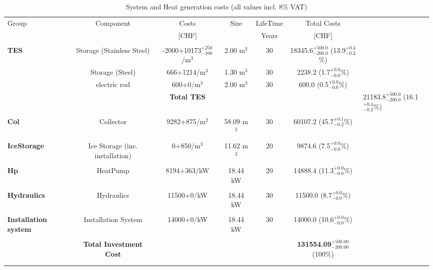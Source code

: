 \documentclass[english]{SPFShortReport}
\begin{document}
\begin{table}[!ht]
\centering
\caption{System and Heat generation costs (all values incl. 8$\%$ VAT) }
\begin{adjustbox}{max width =\textwidth}
\begin{tabular}{l | c c c c c } 
\hline
\hline
Group &Component &Costs &Size &LifeTime &Total Costs \\ 
 & &[CHF] & &Years &[CHF]\\ 
\hline
\\
\textbf{TES} & Storage (Stainless Steel) & -2000+10173$^{\mathrm{+250}}_{\mathrm{-100}}$/m$^3$ & 2.00 m$^3$ & 30 & 18345.6$^{\mathrm{+500.0}}_{\mathrm{-200.0}}$ (13.9$^{\mathrm{+0.4}}_{\mathrm{-0.2}}$\%) \\
 & Storage (Steel) & 666+1214/m$^3$ & 1.30 m$^3$ & 30 & 2238.2 (1.7$^{\mathrm{+0.0}}_{\mathrm{-0.0}}$\%) \\
 & electric rod & 600+0/m$^3$ & 2.00 m$^3$ & 30 & 600.0 (0.5$^{\mathrm{+0.0}}_{\mathrm{-0.0}}$\%) \\
&
 & \textbf{Total TES} & & & & 21183.8$^{\mathrm{+500.0}}_{\mathrm{-200.0}}$ (16.1$^{\mathrm{+0.4}}_{\mathrm{-0.2}}$\%) \\
\hline \\
\textbf{Col} & Collector & 9282+875/m$^2$ & 58.09 m$^2$ & 30 & 60107.2 (45.7$^{\mathrm{+0.1}}_{\mathrm{-0.2}}$\%) \\
\hline \\
\textbf{IceStorage} & Ice Storage (inc. installation) & 0+850/m$^3$ & 11.62 m$^3$ & 20 & 9874.6 (7.5$^{\mathrm{+0.0}}_{\mathrm{-0.0}}$\%) \\
\hline \\
\textbf{Hp} & HeatPump & 8194+363/kW & 18.44 kW & 20 & 14888.4 (11.3$^{\mathrm{+0.0}}_{\mathrm{-0.0}}$\%) \\
\hline \\
\textbf{Hydraulics} & Hydraulics & 11500+0/kW & 18.44 kW & 30 & 11500.0 (8.7$^{\mathrm{+0.0}}_{\mathrm{-0.0}}$\%) \\
\hline \\
\textbf{Installation system} & Installation System & 14000+0/kW & 18.44 kW & 30 & 14000.0 (10.6$^{\mathrm{+0.0}}_{\mathrm{-0.0}}$\%) \\
\hline \\
 & \textbf{Total Investment Cost} & & & & \textbf{131554.09$^{\mathrm{+500.00}}_{\mathrm{-200.00}}$} (100\%) \\ 
\hline \\ 
\hline \\ 

\end{tabular}
\end{adjustbox}
\end{table}
\end{document}

